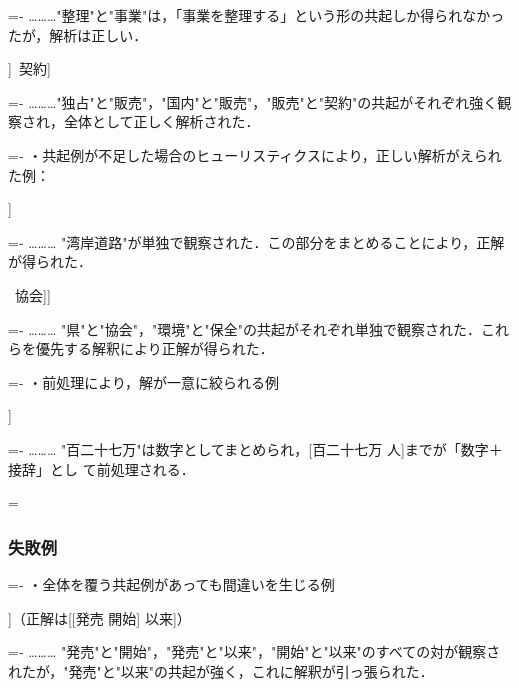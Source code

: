 \settowidth{\leftskip}{・[[改正……}
\settowidth{\parindent}{………\ }
\parindent=-\parindent
………"整理"と"事業"は，「事業を整理する」という形の共起しか得られなかったが，解析は正しい．

\settowidth{\leftskip}{・}
\noindent
[[国内\ [独占\ 販売]]\ 契約]

\settowidth{\leftskip}{・[[改正……}
\settowidth{\parindent}{………\ }
\parindent=-\parindent
………"独占"と"販売"，"国内"と"販売"，"販売"と"契約"の共起がそれぞれ強く観察され，全体として正しく解析された．

\settowidth{\leftskip}{・}
\settowidth{\parindent}{・}
\parindent=-\parindent
・共起例が不足した場合のヒューリスティクスにより，正しい解析がえられた例：

\settowidth{\leftskip}{・}
\noindent
[第二\ [湾岸\ 道路]]

\settowidth{\leftskip}{・[[改正……}
\settowidth{\parindent}{………\ }
\parindent=-\parindent
……… "湾岸道路"が単独で観察された．この部分をまとめることにより，正解が得られた．

\settowidth{\leftskip}{・}
\noindent
[県\ [[環境\ 保全]\ 協会]]

\settowidth{\leftskip}{・[[改正……}
\settowidth{\parindent}{………\ }
\parindent=-\parindent
……… "県"と"協会"，"環境"と"保全"の共起がそれぞれ単独で観察された．これらを優先する解釈により正解が得られた．

\settowidth{\leftskip}{・}
\settowidth{\parindent}{・}
\parindent=-\parindent
・前処理により，解が一意に絞られる例

\settowidth{\leftskip}{・}
\noindent
[同 [百二十七万 人]]

\settowidth{\leftskip}{・[[改正……}
\settowidth{\parindent}{………\ }
\parindent=-\parindent
……… "百二十七万"は数字としてまとめられ，[百二十七万 人]までが「数字＋接辞」とし\break
て前処理される．

\parindent=\originalparindent
\leftskip=0mm

\subsubsection{失敗例}\label{失敗例}

\settowidth{\leftskip}{・}
\settowidth{\parindent}{・}
\parindent=-\parindent
・全体を覆う共起例があっても間違いを生じる例

\settowidth{\leftskip}{・}
\noindent
[発売 [開始 以来]]（正解は[[発売 開始] 以来]）

\settowidth{\leftskip}{・[[改正……}
\settowidth{\parindent}{………\ }
\parindent=-\parindent
……… "発売"と"開始"，"発売"と"以来"，"開始"と"以来"のすべての対が観察されたが，"発売"と"以来"の共起が強く，これに解釈が引っ張られた．

